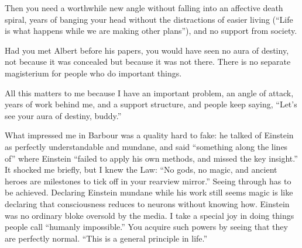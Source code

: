 Then you need a worthwhile new angle without falling into an affective death spiral, years of banging your head without the distractions of easier living (``Life is what happens while we are making other plans''), and no support from society. 

Had you met Albert before his papers, you would have seen no aura of destiny, not because it was concealed but because it was not there. There is no separate magisterium for people who do important things. 

All this matters to me because I have an important problem, an angle of attack, years of work behind me, and a support structure, and people keep saying, ``Let's see your aura of destiny, buddy.''

What impressed me in Barbour was a quality hard to fake: he talked of Einstein as perfectly understandable and mundane, and said ``something along the lines of'' where Einstein ``failed to apply his own methods, and missed the key insight.'' It shocked me briefly, but I knew the Law: ``No gods, no magic, and ancient heroes are milestones to tick off in your rearview mirror.'' Seeing through has to be achieved. Declaring Einstein mundane while his work still seems magic is like declaring that consciousness reduces to neurons without knowing how. Einstein was no ordinary bloke oversold by the media. I take a special joy in doing things people call ``humanly impossible.''  You acquire such powers by seeing that they are perfectly normal. ``This is a general principle in life.''
